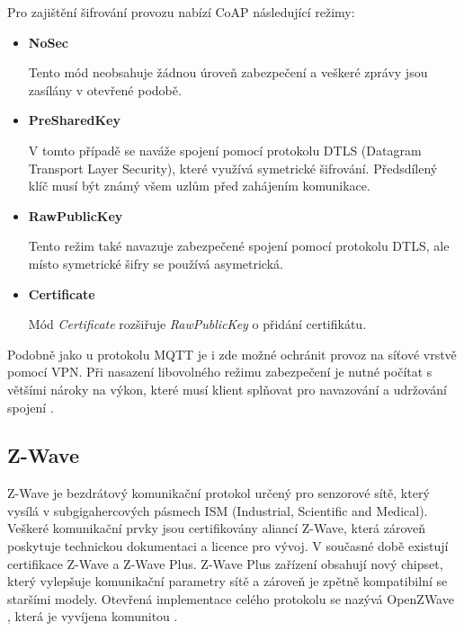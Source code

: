    Pro zajištění šifrování provozu nabízí CoAP následující režimy:
   \begin{itemize}
    \item \textbf{NoSec}
    
    Tento mód neobsahuje žádnou úroveň zabezpečení a veškeré zprávy jsou zasílány
    v otevřené podobě. 
    
    \item \textbf{PreSharedKey}
    
    V tomto případě se naváže spojení pomocí protokolu DTLS (Datagram Transport
    Layer Security), které využívá symetrické šifrování. Předsdílený klíč musí
    být známý všem uzlům před zahájením komunikace. 
    
    \item \textbf{RawPublicKey}
    
    Tento režim také navazuje zabezpečené spojení pomocí protokolu DTLS, ale místo
    symetrické šifry se používá asymetrická.
    
    \item \textbf{Certificate}
    
    Mód \textit{Certificate} rozšiřuje \textit{RawPublicKey} o přidání certifikátu.
   \end{itemize}

   Podobně jako u protokolu MQTT je i zde možné ochránit provoz na síťové
   vrstvě pomocí VPN. Při nasazení libovolného režimu zabezpečení je nutné počítat 
   s většími nároky na výkon, které musí klient splňovat pro navazování a udržování 
   spojení \cite{coap}.
   
  \subsection{Z-Wave}
  
  Z-Wave je bezdrátový komunikační protokol určený pro senzorové sítě, který vysílá 
  v subgigahercových pásmech ISM (Industrial, Scientific and Medical). Veškeré komunikační
  prvky jsou certifikovány aliancí Z-Wave, která zároveň poskytuje technickou dokumentaci a
  licence pro vývoj. V současné době existují certifikace Z-Wave a Z-Wave Plus. 
  Z-Wave Plus zařízení obsahují nový chipset, který vylepšuje komunikační parametry
  sítě a zároveň je zpětně kompatibilní se staršími modely. \cite{z-plus}
  Otevřená implementace celého protokolu se nazývá OpenZWave \cite{openzwave}, která
  je vyvíjena komunitou \cite{cesnet-survey}.
 
